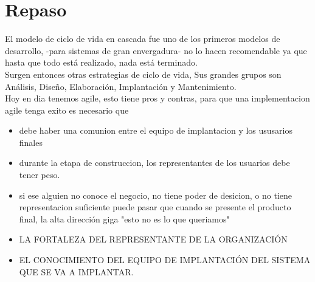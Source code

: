 \documentclass[12pt]{book}
\begin{document}
\chapter{Repaso}
El modelo de ciclo de vida en cascada fue uno de los primeros modelos de desarrollo, -para sistemas de gran envergadura- no lo hacen recomendable ya que
hasta que todo está realizado, nada está terminado.
\\
Surgen entonces otras estrategias de ciclo de vida, Sus grandes grupos son Análisis, Diseño,
Elaboración, Implantación y Mantenimiento.\\

Hoy en dia tenemos agile, esto tiene pros y contras, para que una implementacion agile tenga exito es necesario que
\begin{itemize}
    \item debe haber una comunion entre el equipo de implantacion y los ususarios finales
    \item durante la etapa de construccion, los representantes de los usuarios debe tener peso.
    \item si ese alguien no conoce el negocio, no tiene poder de desicion, o no tiene representacion suficiente puede pasar que 
            cuando se presente el producto final, la alta dirección giga "esto no es lo que queriamos"
    \item LA FORTALEZA DEL REPRESENTANTE DE LA ORGANIZACIÓN
    \item EL CONOCIMIENTO DEL EQUIPO DE IMPLANTACIÓN DEL SISTEMA QUE SE VA A IMPLANTAR.
\end{itemize}
\end{document}
